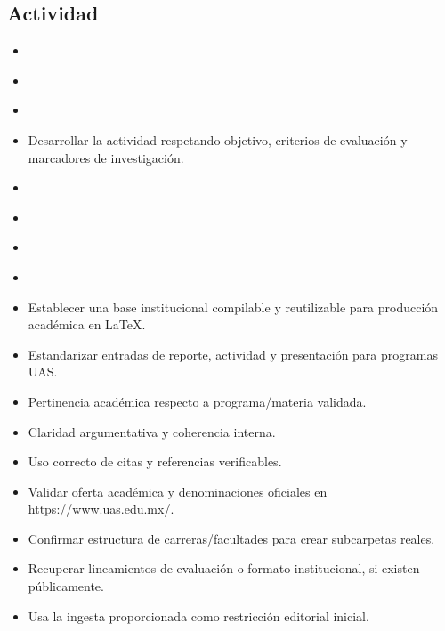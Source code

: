 \documentclass[12pt]{article}
\begin{document}
\subsection*{Actividad}
\begin{itemize}[leftmargin=*]
  \item \\%
  \item \\%
  \item \\%
  \item Desarrollar la actividad respetando objetivo, criterios de evaluación y marcadores de investigación.
  \item \\%
  \item \\%
  \item \\%
  \item \\%
  \item Establecer una base institucional compilable y reutilizable para producción académica en LaTeX.
  \item Estandarizar entradas de reporte, actividad y presentación para programas UAS.
  \item Pertinencia académica respecto a programa/materia validada.
  \item Claridad argumentativa y coherencia interna.
  \item Uso correcto de citas y referencias verificables.
  \item Validar oferta académica y denominaciones oficiales en https://www.uas.edu.mx/.
  \item Confirmar estructura de carreras/facultades para crear subcarpetas reales.
  \item Recuperar lineamientos de evaluación o formato institucional, si existen públicamente.
  \item Usa la ingesta proporcionada como restricción editorial inicial.
\end{itemize}
\end{document}

